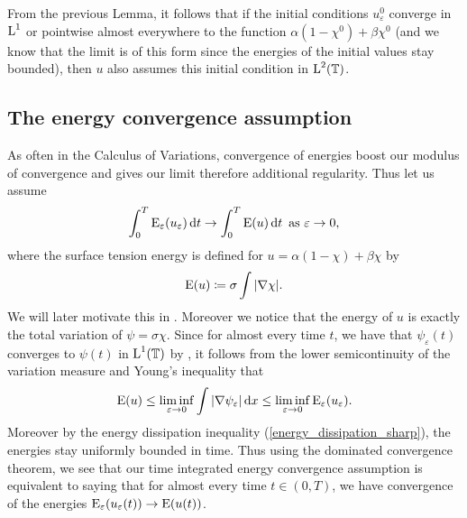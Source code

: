 \begin{remark}
	From the previous Lemma, it follows that if the initial conditions $ u_{ \varepsilon }^{ 0 } $ converge in $ \operatorname{L}^{ 1 } $ or pointwise almost everywhere to the function $ \alpha ( 1 - \chi^{ 0 } ) + \beta \chi^{ 0 } $ (and we know that the limit is of this form since the energies of the initial values stay bounded), then $ u $ also assumes this initial condition in $ \operatorname{L}^{ 2 } ( \operatorname{\mathbb{T}} ) $.
\end{remark}

\subsection{The energy convergence assumption}

As often in the Calculus of Variations, convergence of energies boost our modulus of convergence and gives our limit therefore additional regularity. 
Thus let us assume 
\begin{equation}
	\label{energy_convergence}
	\int_{ 0 }^{ T }
		\operatorname{E}_{ \varepsilon } ( u_{ \varepsilon } ) 
	\dd{ t }
	\to 
	\int_{ 0 }^{ T }
		\operatorname{E} ( u )
	\dd{ t }
	\text{ as }
	\varepsilon \to 0,
\end{equation}
where the surface tension energy is defined for $ u = \alpha ( 1 - \chi ) + \beta \chi $ by 
\begin{equation}
	\operatorname{E} ( u ) 
	\coloneqq
	\sigma \int \abs{ \nabla \chi }.
\end{equation}
We will later motivate this in .
Moreover we notice that the energy of $ u $ is exactly the total variation of $ \psi = \sigma \chi $.
Since for almost every time $ t $, we have that $ \psi_{ \varepsilon } ( t ) $ converges to $ \psi ( t ) $ in $ \operatorname{L}^{ 1 }  ( \operatorname{\mathbb{T}} ) $ by , it follows from the lower semicontinuity of the variation measure and Young's inequality that
\begin{equation*}
	\operatorname{E} ( u ) 
	\leq
	\liminf_{ \varepsilon \to 0 }
	\int
		\abs{ \nabla \psi_{ \varepsilon } }
	\dd{ x }
	\leq
	\liminf_{ \varepsilon \to 0 }
		\operatorname{E}_{ \varepsilon } ( u_{ \varepsilon } ).
\end{equation*}
Moreover by the energy dissipation inequality (\ref{energy_dissipation_sharp}), the energies stay uniformly bounded in time. Thus using the dominated convergence theorem, we see that our time integrated energy convergence assumption is equivalent to saying that for almost every time $ t \in ( 0, T ) $, we have convergence of the energies $ \operatorname{E}_{ \varepsilon } ( u_{ \varepsilon } ( t ) ) \to \operatorname{E} ( u ( t ) ) $.

